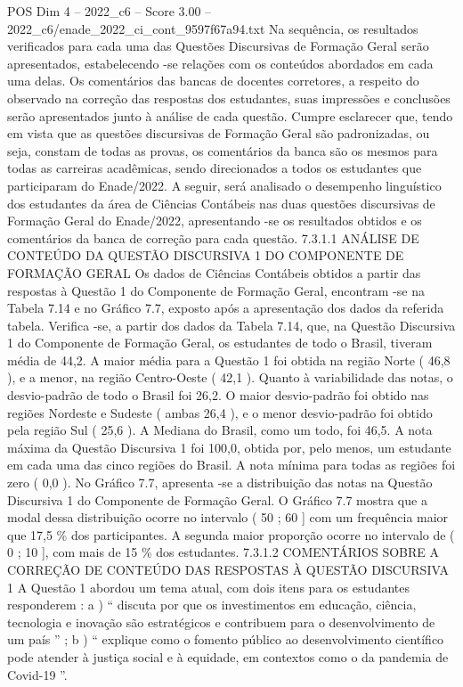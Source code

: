 \begin{textsample}{POS Dim 4 – 2022\_c6 – Score 3.00 – 2022\_c6/enade\_2022\_ci\_cont\_9597f67a94.txt}
Na sequência, os resultados verificados para cada uma das Questões Discursivas de Formação Geral serão apresentados, estabelecendo -se relações com os conteúdos abordados em cada uma delas.
Os comentários das bancas de docentes corretores, a respeito do observado na correção das respostas dos estudantes, suas impressões e conclusões serão apresentados junto à análise de cada questão.
Cumpre esclarecer que, tendo em vista que as questões discursivas de Formação Geral são padronizadas, ou seja, constam de todas as provas, os comentários da banca são os mesmos para todas as carreiras acadêmicas, sendo direcionados a todos os estudantes que participaram do Enade/2022.
A seguir, será analisado o desempenho linguístico dos estudantes da área de Ciências Contábeis nas duas questões discursivas de Formação Geral do Enade/2022, apresentando -se os resultados obtidos e os comentários da banca de correção para cada questão. 7.3.1.1 ANÁLISE DE CONTEÚDO DA QUESTÃO DISCURSIVA 1 DO COMPONENTE DE FORMAÇÃO GERAL Os dados de Ciências Contábeis obtidos a partir das respostas à Questão 1 do Componente de Formação Geral, encontram -se na Tabela 7.14 e no Gráfico 7.7, exposto após a apresentação dos dados da referida tabela.
Verifica -se, a partir dos dados da Tabela 7.14, que, na Questão Discursiva 1 do Componente de Formação Geral, os estudantes de todo o Brasil, tiveram média de 44,2.
A maior média para a Questão 1 foi obtida na região Norte ( 46,8 ), e a menor, na região Centro-Oeste ( 42,1 ).
Quanto à variabilidade das notas, o desvio-padrão de todo o Brasil foi 26,2.
O maior desvio-padrão foi obtido nas regiões Nordeste e Sudeste ( ambas 26,4 ), e o menor desvio-padrão foi obtido pela região Sul ( 25,6 ).
A Mediana do Brasil, como um todo, foi 46,5.
A nota máxima da Questão Discursiva 1 foi 100,0, obtida por, pelo menos, um estudante em cada uma das cinco regiões do Brasil.
A nota mínima para todas as regiões foi zero ( 0,0 ).
No Gráfico 7.7, apresenta -se a distribuição das notas na Questão Discursiva 1 do Componente de Formação Geral.
O Gráfico 7.7 mostra que a modal dessa distribuição ocorre no intervalo ( 50 ; 60 ] com um frequência maior que 17,5 \% dos participantes.
A segunda maior proporção ocorre no intervalo de ( 0 ; 10 ], com mais de 15 \% dos estudantes. 7.3.1.2 COMENTÁRIOS SOBRE A CORREÇÃO DE CONTEÚDO DAS RESPOSTAS À QUESTÃO DISCURSIVA 1 A Questão 1 abordou um tema atual, com dois itens para os estudantes responderem : a ) “ discuta por que os investimentos em educação, ciência, tecnologia e inovação são estratégicos e contribuem para o desenvolvimento de um país ” ; b ) “ explique como o fomento público ao desenvolvimento científico pode atender à justiça social e à equidade, em contextos como o da pandemia de Covid-19 ”.

\end{textsample}

